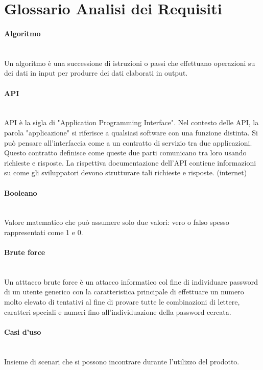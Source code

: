 \section{Glossario Analisi dei Requisiti}

\paragraph{Algoritmo}~\smallskip \\
Un algoritmo è una successione di istruzioni o passi che effettuano operazioni su dei dati in input per produrre dei dati elaborati in output.

\paragraph{API}~\smallskip \\
API è la sigla di "Application Programming Interface". Nel contesto delle API, la parola "applicazione" si riferisce a qualsiasi software con una funzione distinta. Si può pensare all'interfaccia come a un contratto di servizio tra due applicazioni. Questo contratto definisce come queste due parti comunicano tra loro usando richieste e risposte. La rispettiva documentazione dell'API contiene informazioni su come gli sviluppatori devono strutturare tali richieste e risposte. (internet)

\paragraph{Booleano}~\smallskip \\
Valore matematico che può assumere solo due valori: vero o falso spesso rappresentati come 1 e 0.

\paragraph{Brute force}~\smallskip \\
Un atttacco brute force è un attacco informatico col fine di individuare password di un utente generico con la caratteristica principale di effettuare un numero molto elevato di tentativi al fine di provare tutte le combinazioni di lettere, caratteri speciali e numeri fino all'individuazione della password cercata.

\paragraph{Casi d'uso}~\smallskip \\
Insieme di scenari che si possono incontrare durante l'utilizzo del prodotto.

